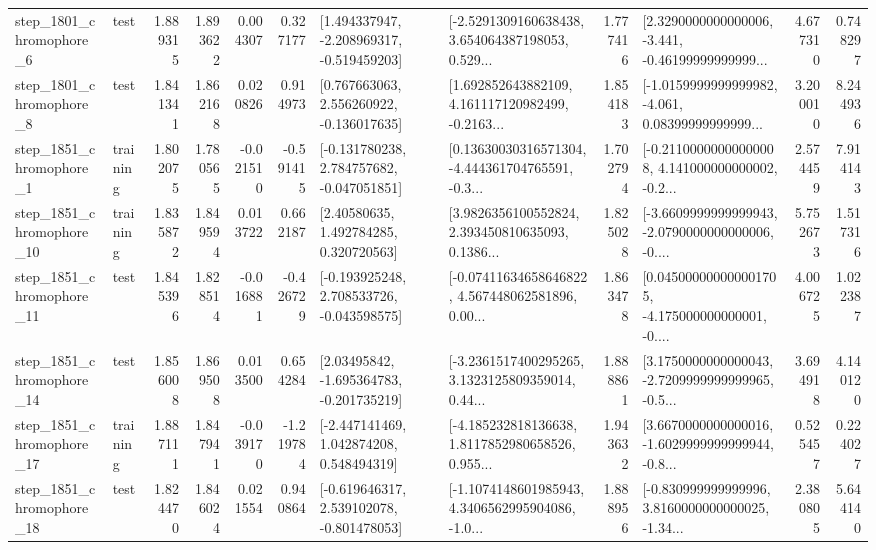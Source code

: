 \begin{tabular}{llrrrrllrlrr}
  step\_1801\_chromophore\_6 &      test &      1.889315 &    1.893622 &      0.004307 &  0.327177 &   [1.494337947, -2.208969317, -0.519459203] &  [-2.5291309160638438, 3.654064387198053, 0.529... &       1.777416 &  [2.3290000000000006, -3.441, -0.46199999999999... &            4.677310 &          0.748297 \\
  step\_1801\_chromophore\_8 &      test &      1.841341 &    1.862168 &      0.020826 &  0.914973 &    [0.767663063, 2.556260922, -0.136017635] &  [1.692852643882109, 4.161117120982499, -0.2163... &       1.854183 &  [-1.0159999999999982, -4.061, 0.08399999999999... &            3.200010 &          8.244936 \\
  step\_1851\_chromophore\_1 &  training &      1.802075 &    1.780565 &     -0.021510 & -0.591415 &   [-0.131780238, 2.784757682, -0.047051851] &  [0.13630030316571304, -4.444361704765591, -0.3... &       1.702794 &  [-0.21100000000000008, 4.141000000000002, -0.2... &            2.574459 &          7.914143 \\
 step\_1851\_chromophore\_10 &  training &      1.835872 &    1.849594 &      0.013722 &  0.662187 &      [2.40580635, 1.492784285, 0.320720563] &  [3.9826356100552824, 2.393450810635093, 0.1386... &       1.825028 &  [-3.6609999999999943, -2.0790000000000006, -0.... &            5.752673 &          1.517316 \\
 step\_1851\_chromophore\_11 &      test &      1.845396 &    1.828514 &     -0.016881 & -0.426729 &   [-0.193925248, 2.708533726, -0.043598575] &  [-0.07411634658646822, 4.567448062581896, 0.00... &       1.863478 &  [0.045000000000001705, -4.175000000000001, -0.... &            4.006725 &          1.022387 \\
 step\_1851\_chromophore\_14 &      test &      1.856008 &    1.869508 &      0.013500 &  0.654284 &    [2.03495842, -1.695364783, -0.201735219] &  [-3.2361517400295265, 3.1323125809359014, 0.44... &       1.888861 &  [3.1750000000000043, -2.7209999999999965, -0.5... &            3.694918 &          4.140120 \\
 step\_1851\_chromophore\_17 &  training &      1.887111 &    1.847941 &     -0.039170 & -1.219784 &    [-2.447141469, 1.042874208, 0.548494319] &  [-4.185232818136638, 1.8117852980658526, 0.955... &       1.943632 &  [3.6670000000000016, -1.6029999999999944, -0.8... &            0.525457 &          0.224027 \\
 step\_1851\_chromophore\_18 &      test &      1.824470 &    1.846024 &      0.021554 &  0.940864 &   [-0.619646317, 2.539102078, -0.801478053] &  [-1.1074148601985943, 4.3406562995904086, -1.0... &       1.888956 &  [-0.830999999999996, 3.8160000000000025, -1.34... &            2.380805 &          5.644140 \\

\end{tabular}
